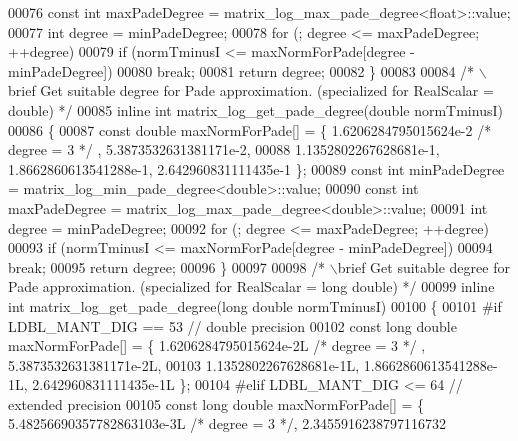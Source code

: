 \begin{DoxyCode}
00076   \textcolor{keyword}{const} \textcolor{keywordtype}{int} maxPadeDegree = matrix\_log\_max\_pade\_degree<float>::value;
00077   \textcolor{keywordtype}{int} degree = minPadeDegree;
00078   \textcolor{keywordflow}{for} (; degree <= maxPadeDegree; ++degree) 
00079     \textcolor{keywordflow}{if} (normTminusI <= maxNormForPade[degree - minPadeDegree])
00080       \textcolor{keywordflow}{break};
00081   \textcolor{keywordflow}{return} degree;
00082 \}
00083 
00084 \textcolor{comment}{/* \(\backslash\)brief Get suitable degree for Pade approximation. (specialized for RealScalar = double) */}
00085 \textcolor{keyword}{inline} \textcolor{keywordtype}{int} matrix\_log\_get\_pade\_degree(\textcolor{keywordtype}{double} normTminusI)
00086 \{
00087   \textcolor{keyword}{const} \textcolor{keywordtype}{double} maxNormForPade[] = \{ 1.6206284795015624e-2 \textcolor{comment}{/* degree = 3 */} , 5.3873532631381171e-2,
00088             1.1352802267628681e-1, 1.8662860613541288e-1, 2.642960831111435e-1 \};
00089   \textcolor{keyword}{const} \textcolor{keywordtype}{int} minPadeDegree = matrix\_log\_min\_pade\_degree<double>::value;
00090   \textcolor{keyword}{const} \textcolor{keywordtype}{int} maxPadeDegree = matrix\_log\_max\_pade\_degree<double>::value;
00091   \textcolor{keywordtype}{int} degree = minPadeDegree;
00092   \textcolor{keywordflow}{for} (; degree <= maxPadeDegree; ++degree)
00093     \textcolor{keywordflow}{if} (normTminusI <= maxNormForPade[degree - minPadeDegree])
00094       \textcolor{keywordflow}{break};
00095   \textcolor{keywordflow}{return} degree;
00096 \}
00097 
00098 \textcolor{comment}{/* \(\backslash\)brief Get suitable degree for Pade approximation. (specialized for RealScalar = long double) */}
00099 \textcolor{keyword}{inline} \textcolor{keywordtype}{int} matrix\_log\_get\_pade\_degree(\textcolor{keywordtype}{long} \textcolor{keywordtype}{double} normTminusI)
00100 \{
00101 \textcolor{preprocessor}{#if   LDBL\_MANT\_DIG == 53         // double precision}
00102   \textcolor{keyword}{const} \textcolor{keywordtype}{long} \textcolor{keywordtype}{double} maxNormForPade[] = \{ 1.6206284795015624e-2L \textcolor{comment}{/* degree = 3 */} , 5.3873532631381171e-2L,
00103             1.1352802267628681e-1L, 1.8662860613541288e-1L, 2.642960831111435e-1L \};
00104 \textcolor{preprocessor}{#elif LDBL\_MANT\_DIG <= 64         // extended precision}
00105   \textcolor{keyword}{const} \textcolor{keywordtype}{long} \textcolor{keywordtype}{double} maxNormForPade[] = \{ 5.48256690357782863103e-3L \textcolor{comment}{/* degree = 3 */}, 2.3455916238797116732

\end{DoxyCode}
